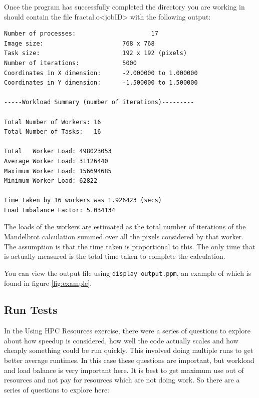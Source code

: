 \documentclass{article}
\begin{document}
Once the program has successfully completed the directory you are working in should contain the file fractal.o<jobID> with the following output:



\begin{lstlisting}[frame=single]
Number of processes:                     17
Image size:                      768 x 768 
Task size:                       192 x 192 (pixels)
Number of iterations:            5000
Coordinates in X dimension:      -2.000000 to 1.000000
Coordinates in Y dimension:      -1.500000 to 1.500000

-----Workload Summary (number of iterations)---------

Total Number of Workers: 16
Total Number of Tasks:   16

Total   Worker Load: 498023053
Average Worker Load: 31126440
Maximum Worker Load: 156694685
Minimum Worker Load: 62822

Time taken by 16 workers was 1.926423 (secs)
Load Imbalance Factor: 5.034134

\end{lstlisting}


The loads of the workers are estimated as the total number of
iterations of the Mandelbrot calculation summed over all the pixels
considered by that worker. The assumption is that the time taken is
proportional to this.
The only time that is actually measured is the total time taken to
complete the calculation.


You can view the output file using
 \verb+display output.ppm+, an example of which is found in figure \ref{fig:example}.

\subsection{Run Tests}

In the Using HPC Resources exercise, there were a series of questions
to explore about how speedup is considered, how well the code actually
scales and how cheaply something could be run quickly. This involved
doing multiple runs to get better average runtimes. In this case these
questions are important, but workload and load balance is very
important here. It is best to get maximum use out of resources and not
pay for resources which are not doing work. So there are a series of
questions to explore here:
\end{document}
